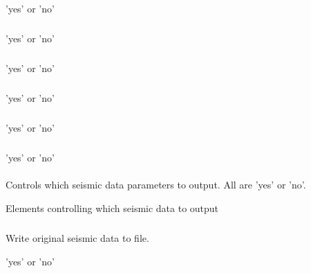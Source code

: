 \subparagraph{}
 \slist
   \item \Description
   \item \Argument 'yes' or 'no'
   \item \Default
 \elist

\subparagraph{}
 \slist
   \item \Description
   \item \Argument 'yes' or 'no'
   \item \Default
 \elist

\subparagraph{}
\slist
  \item \Description
  \item \Argument 'yes' or 'no'
  \item \Default
\elist

\subparagraph{}
 \slist
   \item \Description
   \item \Argument 'yes' or 'no'
   \item \Default
\elist

\subparagraph{}
 \slist
   \item \Description
   \item \Argument 'yes' or 'no'
   \item \Default
\elist

\subparagraph{}
 \slist
   \item \Description
   \item \Argument 'yes' or 'no'
   \item \Default
\elist

\paragraph{}
 \slist
   \item \Description Controls which seismic data parameters to output. All are 'yes' or 'no'.
   \item \Argument Elements controlling which seismic data to output
   \item \Default 
 \elist
\subparagraph{}
 \slist
   \item \Description Write original seismic data to file.
   \item \Argument 'yes' or 'no'
   \item \Default
 \elist

